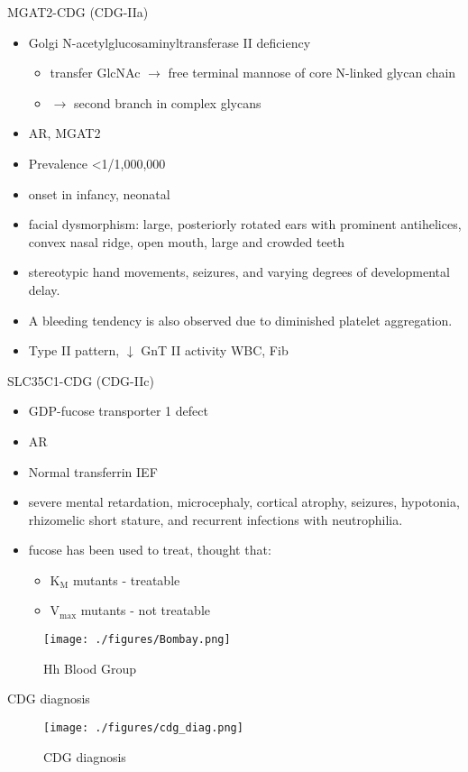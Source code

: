 \documentclass[presentation, smaller]{beamer}
\begin{document}
\begin{frame}[label={sec:org78cd301}]{MGAT2-CDG (CDG-IIa)}
\begin{itemize}
\item Golgi N-acetylglucosaminyltransferase II deficiency
\begin{itemize}
\item transfer GlcNAc \(\to\) free terminal mannose of core N-linked glycan chain
\item \(\to\) second branch in complex glycans
\end{itemize}
\item AR, MGAT2
\item Prevalence \textless{}1/1,000,000
\item onset in infancy, neonatal
\item facial dysmorphism: large, posteriorly rotated ears with prominent
antihelices, convex nasal ridge, open mouth, large and crowded
teeth
\item stereotypic hand movements, seizures, and varying degrees of
developmental delay.
\item A bleeding tendency is also observed due to diminished platelet
aggregation.
\item Type II pattern, \(\downarrow\) GnT II activity WBC, Fib
\end{itemize}
\end{frame}

\begin{frame}[label={sec:org5ba4c72}]{SLC35C1-CDG (CDG-IIc)}
\begin{itemize}
\item GDP-fucose transporter 1	defect
\item AR
\item Normal transferrin IEF
\item severe mental retardation, microcephaly, cortical atrophy, seizures,
hypotonia, rhizomelic short stature, and recurrent infections with
neutrophilia.
\item \alert{fucose has been used to treat}, thought that:
\begin{itemize}
\item K\(_{\text{M}}\) mutants - treatable
\item V\(_{\text{max}}\) mutants - not treatable
\end{itemize}
\end{itemize}

\begin{figure}[htbp]
\centering
\texttt{[image: ./figures/Bombay.png]}
\caption[Hh]{\label{fig:orgec244c0}
Hh Blood Group}
\end{figure}
\end{frame}



\begin{frame}[label={sec:orgb9feeac}]{CDG diagnosis}
\begin{figure}[htbp]
\centering
\texttt{[image: ./figures/cdg\_diag.png]}
\caption{\label{fig:org0f7d76c}
CDG diagnosis}
\end{figure}
\end{frame}
\end{document}
